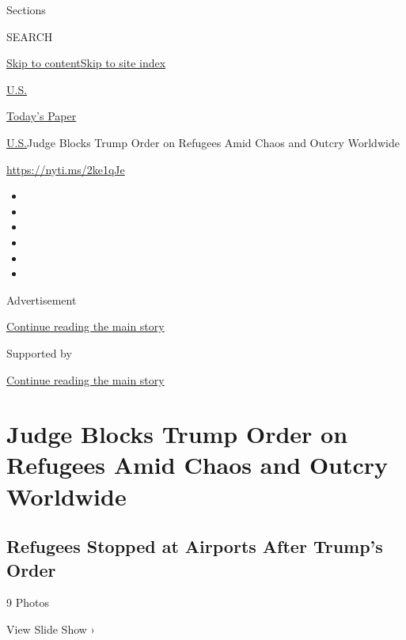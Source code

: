 Sections

SEARCH

\protect\hyperlink{site-content}{Skip to
content}\protect\hyperlink{site-index}{Skip to site index}

\href{https://www.nytimes3xbfgragh.onion/section/us}{U.S.}

\href{https://myaccount.nytimes3xbfgragh.onion/auth/login?response_type=cookie\&client_id=vi}{}

\href{https://www.nytimes3xbfgragh.onion/section/todayspaper}{Today's
Paper}

\href{/section/us}{U.S.}\textbar{}Judge Blocks Trump Order on Refugees
Amid Chaos and Outcry Worldwide

\url{https://nyti.ms/2ke1qJe}

\begin{itemize}
\item
\item
\item
\item
\item
\item
\end{itemize}

Advertisement

\protect\hyperlink{after-top}{Continue reading the main story}

Supported by

\protect\hyperlink{after-sponsor}{Continue reading the main story}

\hypertarget{judge-blocks-trump-order-on-refugees-amid-chaos-and-outcry-worldwide}{%
\section{Judge Blocks Trump Order on Refugees Amid Chaos and Outcry
Worldwide}\label{judge-blocks-trump-order-on-refugees-amid-chaos-and-outcry-worldwide}}

\href{https://www.nytimes3xbfgragh.onion/slideshow/2017/01/28/us/refugees-stopped-at-airports-after-trumps-order.html}{}

\hypertarget{refugees-stopped-at-airports-after-trumps-order}{%
\subsection{Refugees Stopped at Airports After Trump's
Order}\label{refugees-stopped-at-airports-after-trumps-order}}

9 Photos

View Slide Show ›

